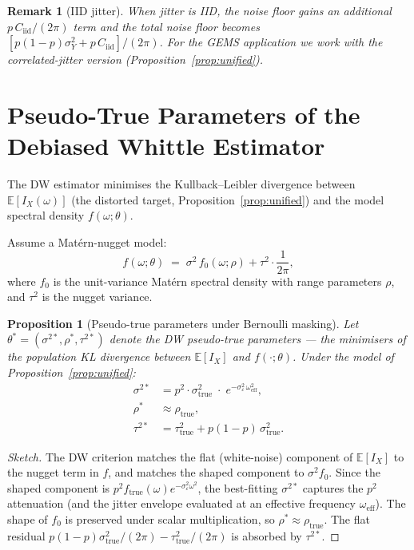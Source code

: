 \documentclass[12pt]{article}
\newtheorem{proposition}{Proposition}
\newtheorem{remark}{Remark}
\begin{document}
\begin{remark}[IID jitter]
When jitter is IID, the noise floor gains an additional
$p\,C_{\mathrm{iid}}/(2\pi)$ term and the total noise floor becomes
$[p(1-p)\sigma^2_Y + p\,C_{\mathrm{iid}}]/(2\pi)$.
For the GEMS application we work with the correlated-jitter version
(Proposition~\ref{prop:unified}).
\end{remark}


\section{Pseudo-True Parameters of the Debiased Whittle Estimator}

The DW estimator minimises the Kullback--Leibler divergence between
$\mathbb{E}[I_X(\omega)]$ (the distorted target, Proposition~\ref{prop:unified})
and the model spectral density $f(\omega;\theta)$.

Assume a Matérn-nugget model:
\[
  f(\omega;\theta) \;=\; \sigma^2\,f_0(\omega;\rho) + \tau^2 \cdot \frac{1}{2\pi},
\]
where $f_0$ is the unit-variance Matérn spectral density with range
parameters $\rho$, and $\tau^2$ is the nugget variance.

\begin{proposition}[Pseudo-true parameters under Bernoulli masking]
\label{prop:pseudo}
Let $\theta^* = (\sigma^{2*}, \rho^*, \tau^{2*})$ denote the DW
pseudo-true parameters — the minimisers of the population KL divergence
between $\mathbb{E}[I_X]$ and $f(\cdot;\theta)$.
Under the model of Proposition~\ref{prop:unified}:
\begin{align}
  \sigma^{2*} &= p^2 \cdot \sigma^2_{\mathrm{true}}
                \;\cdot\; e^{-\sigma^2_\varepsilon\,\omega^2_{\mathrm{eff}}},
  \label{eq:sigma_bias}\\[4pt]
  \rho^* &\approx \rho_{\mathrm{true}},
  \label{eq:range_unbias}\\[4pt]
  \tau^{2*} &= \tau^2_{\mathrm{true}}
               + p(1-p)\,\sigma^2_{\mathrm{true}}.
  \label{eq:nugget_bias}
\end{align}
\end{proposition}

\begin{proof}[Sketch]
The DW criterion matches the flat (white-noise) component of
$\mathbb{E}[I_X]$ to the nugget term in $f$, and matches the shaped
component to $\sigma^2 f_0$.
Since the shaped component is $p^2 f_{\mathrm{true}}(\omega)
e^{-\sigma^2_\varepsilon\omega^2}$, the best-fitting $\sigma^{2*}$
captures the $p^2$ attenuation (and the jitter envelope evaluated at an
effective frequency $\omega_{\mathrm{eff}}$).
The shape of $f_0$ is preserved under scalar multiplication, so
$\rho^*\approx\rho_{\mathrm{true}}$.
The flat residual
$p(1-p)\sigma^2_{\mathrm{true}}/(2\pi) - \tau^2_{\mathrm{true}}/(2\pi)$
is absorbed by $\tau^{2*}$.
\end{proof}
\end{document}
